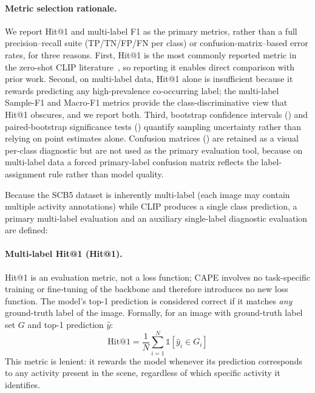 \documentclass[symmetry,article,submit,pdftex,moreauthors]{Definitions/mdpi}
\begin{document}
\paragraph{Metric selection rationale.}
We report Hit@1 and multi-label F1 as the primary metrics, rather than a full precision--recall suite (TP/TN/FP/FN per class) or confusion-matrix--based error rates, for three reasons. First, Hit@1 is the most commonly reported metric in the zero-shot CLIP literature~\cite{radford2021learning,cherti2023reproducible}, so reporting it enables direct comparison with prior work. Second, on multi-label data, Hit@1 alone is insufficient because it rewards predicting any high-prevalence co-occurring label; the multi-label Sample-F1 and Macro-F1 metrics provide the class-discriminative view that Hit@1 obscures, and we report both. Third, bootstrap confidence intervals () and paired-bootstrap significance tests () quantify sampling uncertainty rather than relying on point estimates alone. Confusion matrices () are retained as a visual per-class diagnostic but are not used as the primary evaluation tool, because on multi-label data a forced primary-label confusion matrix reflects the label-assignment rule rather than model quality.

Because the SCB5 dataset is inherently multi-label (each image may contain multiple activity annotations) while CLIP produces a single class prediction, a primary multi-label evaluation and an auxiliary single-label diagnostic evaluation are defined:

\paragraph{Multi-label Hit@1 (Hit@1).}
Hit@1 is an evaluation metric, not a loss function; CAPE involves no task-specific training or fine-tuning of the backbone and therefore introduces no new loss function. The model's top-1 prediction is considered correct if it matches \emph{any} ground-truth label of the image.
Formally, for an image with ground-truth label set $G$ and top-1 prediction $\hat{y}$:
\begin{equation}
\text{Hit@1} = \frac{1}{N}\sum_{i=1}^{N} \mathbb{1}[\hat{y}_i \in G_i]
\end{equation}
This metric is lenient: it rewards the model whenever its prediction corresponds to any activity present in the scene, regardless of which specific activity it identifies.
\end{document}
